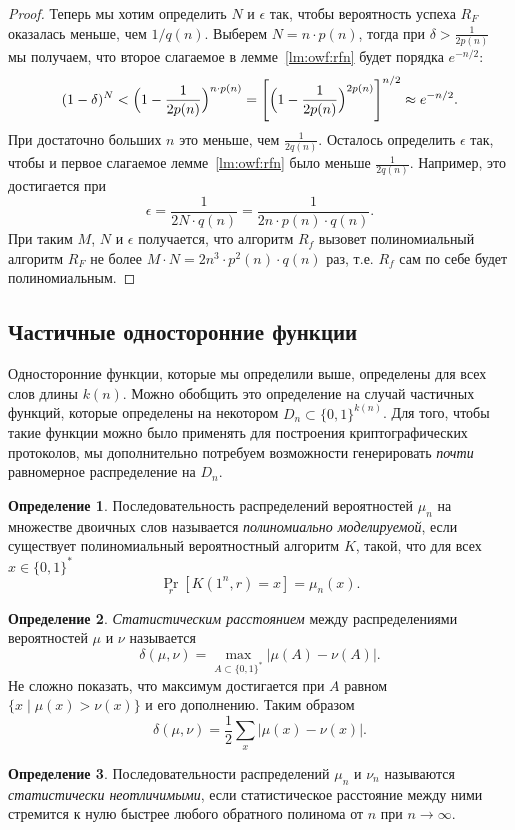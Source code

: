 \documentclass[12pt,a4paper]{article}
\newcommand{\bits}{\{0,1\}}
\newcommand{\bitstr}{\bits^*}
\theoremstyle{definition}
\newtheorem{definition}{Определение}[section]
\theoremstyle{plain}
\theoremstyle{remark}
\begin{document}
\begin{proof}
Теперь мы хотим определить $N$ и $\epsilon$ так, чтобы вероятность успеха $R_F$ оказалась
меньше, чем $1/q(n)$. Выберем $N = n\cdot p(n)$, тогда при $\delta > \frac{1}{2p(n)}$ мы получаем, 
что второе слагаемое в лемме~\ref{lm:owf:rfn} будет порядка $e^{-n/2}$:
$$(1 - \delta)^N < \Bigl (1 - \frac{1}{2p(n)}  \Bigr)^{n\cdot p(n)} 
= \Biggl[\Bigl(1 - \frac{1}{2p(n)}  \Bigr)^{2p(n)}\Biggr]^{n/2} \approx e^{-n/2}.$$
При достаточно больших $n$ это меньше, чем $\frac{1}{2q(n)}$.
Осталось определить $\epsilon$ так, чтобы и первое слагаемое лемме~\ref{lm:owf:rfn}
было меньше $\frac{1}{2q(n)}$. Например, это достигается при
$$\epsilon = \frac{1}{2N\cdot q(n)} = \frac{1}{2n\cdot p(n)\cdot q(n)}.$$
При таким $M$, $N$ и $\epsilon$ получается, что алгоритм $R_f$ вызовет
полиномиальный алгоритм $R_F$ не более $M\cdot N = 2n^3\cdot p^2(n)\cdot q(n)$ раз,
т.е. $R_f$ сам по себе будет полиномиальным.

\end{proof}


\subsection{Частичные односторонние функции}
Односторонние функции, которые мы определили выше, определены
для всех слов длины $k(n)$. Можно обобщить это определение на
случай частичных функций, которые определены на некотором 
$D_n\subset\bits^{k(n)}$. Для того, чтобы такие функции можно 
было применять для построения криптографических протоколов,
мы дополнительно потребуем возможности
генерировать \emph{почти} равномерное распределение на $D_n$.

\begin{definition}
Последовательность распределений вероятностей $\mu_n$ 
на множестве двоичных слов называется \emph{полиномиально 
моделируемой}, если существует полиномиальный вероятностный
алгоритм $K$, такой, что для всех $x\in\bitstr$
$$\Pr_r[K(1^n, r) = x] = \mu_n(x).$$
\end{definition}

\begin{definition}
\emph{Статистическим расстоянием} между распределениями
вероятностей $\mu$ и $\nu$ называется
$$\delta(\mu,\nu) = \max_{A\subset\bitstr}|\mu(A) - \nu(A)|.$$
Не сложно показать, что максимум достигается при $A$ равном 
$\{x \mid \mu(x) > \nu(x)\}$ и его дополнению.
Таким образом 
$$\delta(\mu,\nu) = \frac12\sum_{x} |\mu(x) - \nu(x)|.$$
\end{definition}

\begin{definition}
Последовательности распределений $\mu_n$ и $\nu_n$ называются
\emph{статистически неотличимыми}, если статистическое расстояние
между ними стремится к нулю быстрее любого обратного полинома от $n$
при $n\to\infty$. 
\end{definition}
\end{document}
